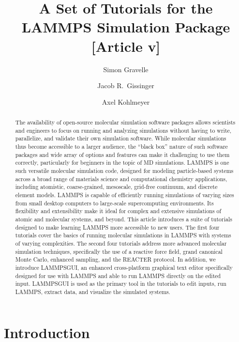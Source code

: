 \documentclass[9pt,tutorial]{livecoms}
\title{A Set of Tutorials for the LAMMPS Simulation Package [Article v\versionnumber]}
\author[1*]{Simon Gravelle}
\affil[1]{University Grenoble Alpes, CNRS, LIPhy, Grenoble, 38000, France}
\author[2]{Jacob R.~Gissinger}
\affil[2]{Stevens Institute of Technology, Hoboken, NJ 07030, USA}
\author[3]{Axel Kohlmeyer}
\affil[3]{Institute for Computational Molecular Science, Temple University, Philadelphia, PA 19122, USA}
\newcommand{\lammpsgui}{\textsf{LAMMPS\textendash GUI}}
\begin{document}
\begin{frontmatter}
\maketitle

\begin{abstract}
  The availability of open-source molecular simulation software packages
  allows scientists and engineers to focus on running and analyzing
  simulations without having to write, parallelize, and validate their
  own simulation software.  While molecular simulations thus become
  accessible to a larger audience, the ``black box'' nature of such
  software packages and wide array of options and features can make it
  challenging to use them correctly, particularly for beginners in the
  topic of MD simulations.  LAMMPS is one such versatile molecular
  simulation code, designed for modeling particle-based systems across a
  broad range of materials science and computational chemistry
  applications, including atomistic, coarse-grained, mesoscale,
  grid-free continuum, and discrete element models.  LAMMPS is capable
  of efficiently running simulations of varying sizes from small desktop
  computers to large-scale supercomputing environments.  Its flexibility
  and extensibility make it ideal for complex and extensive simulations
  of atomic and molecular systems, and beyond.  This article introduces
  a suite of tutorials designed to make learning LAMMPS more accessible
  to new users.  The first four tutorials cover the basics of running
  molecular simulations in LAMMPS with systems of varying complexities.
  The second four tutorials address more advanced molecular simulation
  techniques, specifically the use of a reactive force field, grand
  canonical Monte Carlo, enhanced sampling, and the REACTER protocol.
  In addition, we introduce \lammpsgui{}, an enhanced cross-platform
  graphical text editor specifically designed for use with LAMMPS and
  able to run LAMMPS directly on the edited input.  \lammpsgui{} is used
  as the primary tool in the tutorials to edit inputs, run LAMMPS,
  extract data, and visualize the simulated systems.
\end{abstract}

\end{frontmatter}

\section{Introduction}
\end{document}
